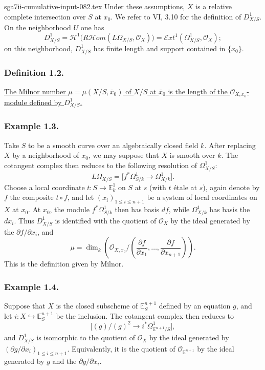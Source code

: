 \begin{filecontents*}{sga7ii-cumulative-input-082.tex}
Under these assumptions, $X$ is a relative complete intersection
over $S$ at $x_0$.  We refer to VI, 3.10 for the definition of
$D^1_{X/S}$.  On the neighborhood $U$ one has
\[
D^1_{X/S}
=\mathcal H^1\bigl(R\mathcal Hom(L\Omega_{X/S},\mathcal O_X)\bigr)
=\mathcal Ext^1(\Omega^1_{X/S},\mathcal O_X);
\]
on this neighborhood, $D^1_{X/S}$ has finite length and support
contained in $\{x_0\}$.

\subsubsection*{Definition 1.2.}
\underline{The Milnor number
$\mu=\mu(X/S,\bar x_0)$ of $X/S$ at $\bar x_0$ is the length of the
$\mathcal O_{X,x_0}$-module defined by $D^1_{X/S}$.}

\subsubsection*{Example 1.3.}
Take $S$ to be a smooth curve over an algebraically closed field
$k$.  After replacing $X$ by a neighborhood of $x_0$, we may suppose
that $X$ is smooth over $k$.  The cotangent complex then reduces to
the following resolution of $\Omega^1_{X/S}$:
\[
L\Omega_{X/S}
=\bigl[f^*\Omega^1_{S/k}\longrightarrow\Omega^1_{X/k}\bigr].
\]
Choose a local coordinate $t:S\to\mathbb E^1_k$ on $S$ at $s$
(with $t$ \'etale at $s$), again denote by $f$ the composite
$t\circ f$, and let $(x_i)_{1\le i\le n+1}$ be a system of local
coordinates on $X$ at $x_0$.  At $x_0$, the module
$f^*\Omega^1_{S/k}$ then has basis $df$, while $\Omega^1_{X/k}$ has
basis the $dx_i$.  Thus $D^1_{X/S}$ is identified with the quotient
of $\mathcal O_X$ by the ideal generated by the
$\partial f/\partial x_i$, and
\begin{equation}\tag{1.3.1}
\mu=\dim_k\!\left(
\mathcal O_{X,x_0}/
\left(\frac{\partial f}{\partial x_1},\ldots,
      \frac{\partial f}{\partial x_{n+1}}\right)\right).
\end{equation}
This is the definition given by Milnor.

\subsubsection*{Example 1.4.}
Suppose that $X$ is the closed subscheme of $\mathbb E^{n+1}_S$
defined by an equation $g$, and let
$i:X\hookrightarrow\mathbb E^{n+1}_S$ be the inclusion.  The
cotangent complex then reduces to
\[
\bigl[(g)/(g)^2\longrightarrow
i^*\Omega^1_{\mathbb E^{n+1}/S}\bigr],
\]
and $D^1_{X/S}$ is isomorphic to the quotient of $\mathcal O_X$ by
the ideal generated by
$(\partial g/\partial x_i)_{1\le i\le n+1}$.  Equivalently, it is
the quotient of $\mathcal O_{\mathbb E^{n+1}}$ by the ideal generated
by $g$ and the $\partial g/\partial x_i$.


\end{filecontents*}
